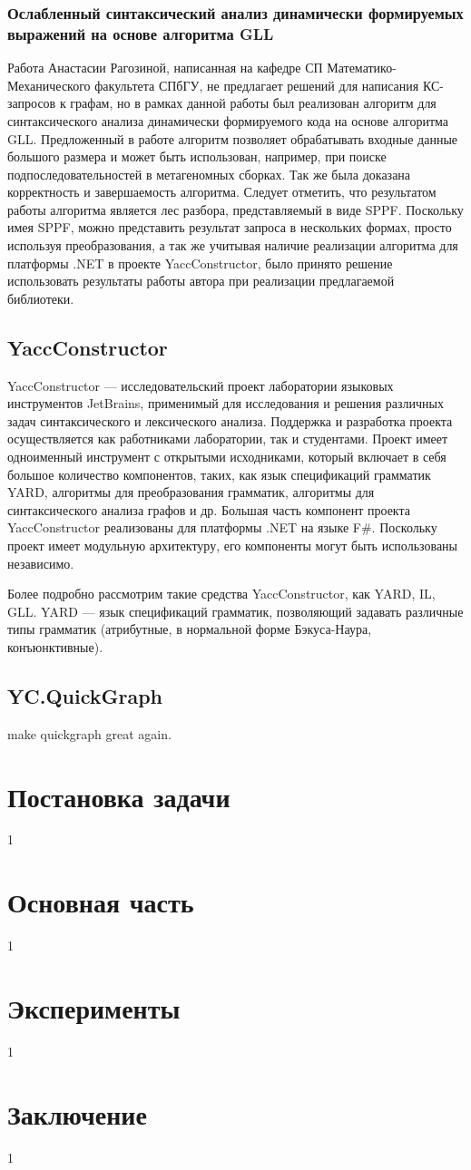 \documentclass[14pt]{matmex-diploma-custom}
\begin{document}
		\subsubsection{Ослабленный синтаксический анализ динамически формируемых выражений на основе алгоритма GLL}
		Работа Анастасии Рагозиной, написанная на кафедре СП Математико-Механического факультета СПбГУ, не предлагает решений для написания КС-запросов к графам, но в рамках данной работы был реализован алгоритм для синтаксического анализа динамически формируемого кода на основе алгоритма GLL. Предложенный в работе алгоритм позволяет обрабатывать входные данные большого размера и может быть использован, например, при поиске подпоследовательностей в метагеномных сборках. Так же была доказана корректность и завершаемость алгоритма. Следует отметить, что результатом работы алгоритма является лес разбора, представляемый в виде SPPF\cite{sppf}. Поскольку имея SPPF, можно представить результат запроса в нескольких формах, просто используя преобразования, а так же учитывая наличие реализации алгоритма для платформы .NET в проекте YaccConstructor, было принято решение использовать результаты работы автора при реализации предлагаемой библиотеки.
	\subsection{YaccConstructor}
	    YaccConstructor --- исследовательский проект лаборатории языковых инструментов JetBrains, применимый для исследования и решения различных задач синтаксического и лексического анализа. Поддержка и разработка проекта осуществляется как работниками лаборатории, так и студентами. Проект имеет одноименный инструмент с открытыми исходниками, который включает в себя большое количество компонентов, таких, как язык спецификаций грамматик YARD, алгоритмы для преобразования грамматик, алгоритмы для синтаксического анализа графов и др. Большая часть компонент проекта YaccConstructor реализованы для платформы .NET на языке F\#. Поскольку проект имеет модульную архитектуру, его компоненты могут быть использованы независимо.
	    
	    Более подробно рассмотрим такие средства YaccConstructor, как YARD, IL, GLL. YARD --- язык спецификаций грамматик, позволяющий задавать различные типы грамматик (атрибутные, в нормальной форме Бэкуса-Наура, конъюнктивные).
	\subsection{YC.QuickGraph}
	    make quickgraph great again.
\section{Постановка задачи}
1
\section{Основная часть}
1
\section{Эксперименты}
1
\section*{Заключение}
1
\setmonofont[Mapping=tex-text]{CMU Typewriter Text}


\end{document}
